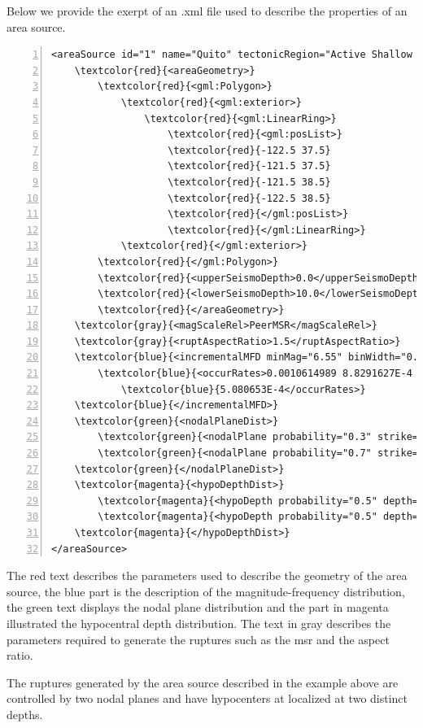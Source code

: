 Below we provide the exerpt of an .xml file used to describe the properties of
an area source.
\begin{Verbatim}[frame=single, commandchars=\\\{\}, fontsize=\footnotesize,
numbers=left, numbersep=2pt]
<areaSource id="1" name="Quito" tectonicRegion="Active Shallow Crust">
    \textcolor{red}{<areaGeometry>}
        \textcolor{red}{<gml:Polygon>}
            \textcolor{red}{<gml:exterior>}
                \textcolor{red}{<gml:LinearRing>}
                    \textcolor{red}{<gml:posList>}
                    \textcolor{red}{-122.5 37.5}
                    \textcolor{red}{-121.5 37.5}
                    \textcolor{red}{-121.5 38.5}
                    \textcolor{red}{-122.5 38.5}
                    \textcolor{red}{</gml:posList>}
                    \textcolor{red}{</gml:LinearRing>}
            \textcolor{red}{</gml:exterior>}
        \textcolor{red}{</gml:Polygon>}
        \textcolor{red}{<upperSeismoDepth>0.0</upperSeismoDepth>}
        \textcolor{red}{<lowerSeismoDepth>10.0</lowerSeismoDepth>}
        \textcolor{red}{</areaGeometry>}
    \textcolor{gray}{<magScaleRel>PeerMSR</magScaleRel>}
    \textcolor{gray}{<ruptAspectRatio>1.5</ruptAspectRatio>}
    \textcolor{blue}{<incrementalMFD minMag="6.55" binWidth="0.1">}
        \textcolor{blue}{<occurRates>0.0010614989 8.8291627E-4 7.3437777E-4 6.108288E-4}
		    \textcolor{blue}{5.080653E-4</occurRates>}
    \textcolor{blue}{</incrementalMFD>}
    \textcolor{green}{<nodalPlaneDist>}
        \textcolor{green}{<nodalPlane probability="0.3" strike="0.0" dip="90.0" rake="0.0"/>}
        \textcolor{green}{<nodalPlane probability="0.7" strike="90.0" dip="45.0" rake="90.0"/>}
    \textcolor{green}{</nodalPlaneDist>}
    \textcolor{magenta}{<hypoDepthDist>}
        \textcolor{magenta}{<hypoDepth probability="0.5" depth="4.0" />}
        \textcolor{magenta}{<hypoDepth probability="0.5" depth="8.0" />}
    \textcolor{magenta}{</hypoDepthDist>}
</areaSource>
\end{Verbatim}
The red text describes the parameters used to describe the geometry of 
the area source, the blue part is the description
of the magnitude-frequency distribution, the green text displays the nodal 
plane distribution and the part in magenta illustrated the hypocentral depth 
distribution.
%
The text in gray describes the parameters required to generate the ruptures 
such as the \gls{msr} and the aspect ratio.

The ruptures generated by the area source described in the example above 
are controlled by two nodal planes and have hypocenters at localized 
at two distinct depths.
%
